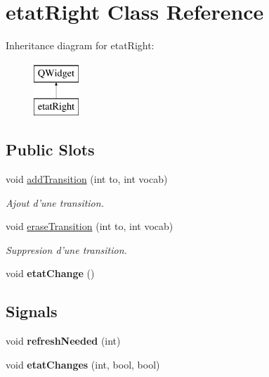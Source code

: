 \hypertarget{classetat_right}{\section{etat\-Right Class Reference}
\label{classetat_right}
}
Inheritance diagram for etat\-Right\-:\begin{figure}[H]
\begin{center}
\leavevmode
\includegraphics[height=2.000000cm]{classetat_right}
\end{center}
\end{figure}
\subsection*{Public Slots}
\begin{DoxyCompactItemize}
\item 
void \hyperlink{classetat_right_a384a6718c6a76d7ad6c49ce8942e0f93}{add\-Transition} (int to, int vocab)
\begin{DoxyCompactList}\small\item\em Ajout d'une transition. \end{DoxyCompactList}\item 
void \hyperlink{classetat_right_a0ea39c8d918126244c9ecbf11b46a0ae}{erase\-Transition} (int to, int vocab)
\begin{DoxyCompactList}\small\item\em Suppresion d'une transition. \end{DoxyCompactList}\item 
\hypertarget{classetat_right_ac15456fc1dacf084b9bcbae7d6699627}{void {\bfseries etat\-Change} ()}\label{classetat_right_ac15456fc1dacf084b9bcbae7d6699627}

\end{DoxyCompactItemize}
\subsection*{Signals}
\begin{DoxyCompactItemize}
\item 
\hypertarget{classetat_right_ac7e6e4cff96fe796b6dcf1c4fca96e48}{void {\bfseries refresh\-Needed} (int)}\label{classetat_right_ac7e6e4cff96fe796b6dcf1c4fca96e48}

\item 
\hypertarget{classetat_right_a4ee395991e158ac64118b802d23b0962}{void {\bfseries etat\-Changes} (int, bool, bool)}\label{classetat_right_a4ee395991e158ac64118b802d23b0962}

\end{DoxyCompactItemize}
